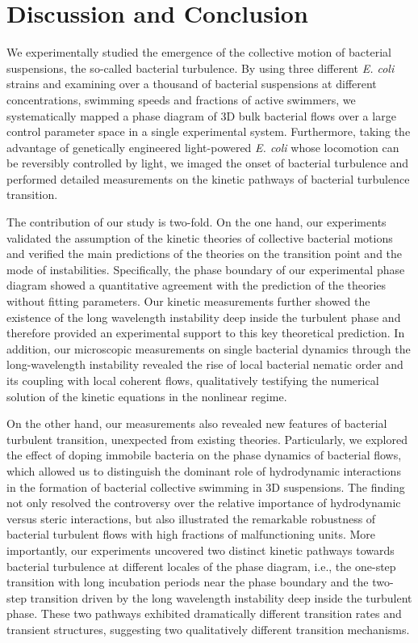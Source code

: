 \section{Discussion and Conclusion}

We experimentally studied the emergence of the collective motion of bacterial suspensions, the so-called bacterial turbulence. By using three different \textit{E. coli} strains and examining over a thousand of bacterial suspensions at different concentrations, swimming speeds and fractions of active swimmers, we
systematically mapped a phase diagram of 3D bulk bacterial flows over a large control parameter space in a single experimental system. Furthermore, taking the advantage of genetically engineered light-powered \textit{E. coli} whose locomotion can be reversibly controlled by light, we imaged the onset of bacterial turbulence and performed detailed measurements on the kinetic pathways of bacterial turbulence transition.

The contribution of our study is two-fold. On the one hand, our experiments validated the assumption of the kinetic theories of collective bacterial motions and verified the main predictions of the theories on the transition point and the mode of instabilities. Specifically, the phase boundary of our experimental phase diagram showed a quantitative agreement with the prediction of the theories without fitting parameters. Our kinetic measurements further showed the existence of the long wavelength instability deep inside the turbulent phase and therefore provided an experimental support to this key theoretical prediction. In
addition, our microscopic measurements on single bacterial dynamics through the long-wavelength instability revealed the rise of local bacterial nematic order and its coupling with local coherent flows, qualitatively testifying the numerical solution of the kinetic equations in the nonlinear regime.


On the other hand, our measurements also revealed new features of bacterial turbulent transition, unexpected from existing theories. Particularly, we explored the effect of doping immobile bacteria on the phase dynamics of bacterial flows, which allowed us to distinguish the dominant role of hydrodynamic interactions in the formation of bacterial collective swimming in 3D suspensions. The finding not only resolved the controversy over the relative importance of hydrodynamic versus steric interactions, but also illustrated the remarkable robustness of bacterial turbulent flows with high fractions of malfunctioning units. More importantly, our experiments uncovered two distinct kinetic pathways towards bacterial turbulence at different locales of the phase diagram, i.e., the one-step transition with long incubation periods near the phase boundary and the two-step transition driven by the long wavelength instability deep inside the turbulent phase. These two pathways exhibited dramatically different transition rates and transient structures, suggesting two qualitatively different transition mechanisms.

